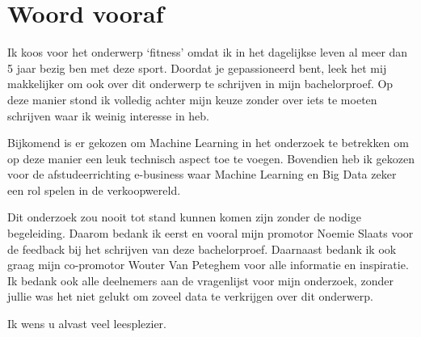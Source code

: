 
\chapter*{Woord vooraf}
\label{ch:voorwoord}


Ik koos voor het onderwerp ‘fitness’ omdat ik in het dagelijkse leven al meer dan 5 jaar bezig ben met deze sport. Doordat je gepassioneerd bent, leek het mij makkelijker om ook over dit onderwerp te schrijven in mijn bachelorproef. Op deze manier stond ik volledig achter mijn keuze zonder over iets te moeten schrijven waar ik weinig interesse in heb. 

Bijkomend is er gekozen om Machine Learning in het onderzoek te betrekken om op deze manier een leuk technisch aspect toe te voegen. Bovendien heb ik gekozen voor de afstudeerrichting e-business waar Machine Learning en Big Data zeker een rol spelen in de verkoopwereld. 

Dit onderzoek zou nooit tot stand kunnen komen zijn zonder de nodige begeleiding. Daarom bedank ik eerst en vooral mijn promotor Noemie Slaats voor de feedback bij het schrijven van deze bachelorproef. Daarnaast bedank ik ook graag mijn co-promotor Wouter Van Peteghem voor alle informatie en inspiratie. Ik bedank ook alle deelnemers aan de vragenlijst voor mijn onderzoek, zonder jullie was het niet gelukt om zoveel data te verkrijgen over dit onderwerp.

Ik wens u alvast veel leesplezier.

